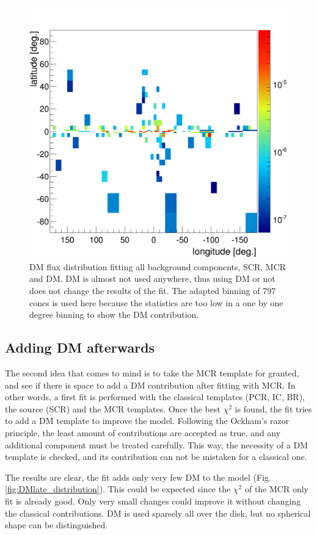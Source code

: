 \begin{figure}[H]
	\centering
	\includegraphics[width=.5\linewidth]{pic/discussion/DM+MCR_DM_distribution.png}
	\caption[DM distribution for a fit using DM and MCR]{DM flux distribution fitting all background components, SCR, MCR and DM. DM is almost not used anywhere, thus using DM or not does not change the results of the fit. The adapted binning of 797 cones is used here because the statistics are too low in a one by one degree binning to show the DM contribution.}
	\label{fig:DM+MCR_distribution}
\end{figure}

\newpage
\subsection{Adding DM afterwards}

The second idea that comes to mind is to take the MCR template for granted, and see if there is space to add a DM contribution after fitting with MCR. In other words, a first fit is performed with the classical templates (PCR, IC, BR), the source (SCR) and the MCR templates. Once the best $\chi^2$ is found, the fit tries to add a DM template to improve the model.
Following the Ockham's razor principle, the least amount of contributions are accepted as true, and any additional component must be treated carefully. This way, the necessity of a DM template is checked, and its contribution can not be mistaken for a classical one.

The results are clear, the fit adds only very few DM to the model (Fig. \ref{fig:DMlate_distribution}). This could be expected since the $\chi^2$ of the MCR only fit is already good. Only very small changes could improve it without changing the classical contributions. DM is used sparsely all over the disk, but no spherical shape can be distinguished. 



